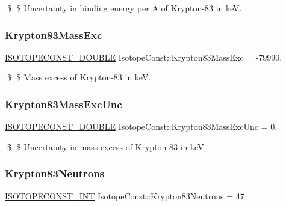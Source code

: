 \$ \$ Uncertainty in binding energy per A of Krypton-\/83 in keV. \mbox{\label{group___isotope_const-_krypton-_kr83_gadecc1351f9e0deb140149fa07912f4de}} 
\subsubsection{\texorpdfstring{Krypton83\+Mass\+Exc}{Krypton83MassExc}}
{\footnotesize\ttfamily \mbox{\hyperlink{group___isotope_const-_macros_ga8f45a7272ce02c0b4c65c44636ed719a}{I\+S\+O\+T\+O\+P\+E\+C\+O\+N\+S\+T\+\_\+\+D\+O\+U\+B\+LE}} Isotope\+Const\+::\+Krypton83\+Mass\+Exc = -\/79990.}

\$ \$ Mass excess of Krypton-\/83 in keV. \mbox{\label{group___isotope_const-_krypton-_kr83_ga3bacacfa5679f28ad0a2ba7652bfaedf}} 
\subsubsection{\texorpdfstring{Krypton83\+Mass\+Exc\+Unc}{Krypton83MassExcUnc}}
{\footnotesize\ttfamily \mbox{\hyperlink{group___isotope_const-_macros_ga8f45a7272ce02c0b4c65c44636ed719a}{I\+S\+O\+T\+O\+P\+E\+C\+O\+N\+S\+T\+\_\+\+D\+O\+U\+B\+LE}} Isotope\+Const\+::\+Krypton83\+Mass\+Exc\+Unc = 0.}

\$ \$ Uncertainty in mass excess of Krypton-\/83 in keV. \mbox{\label{group___isotope_const-_krypton-_kr83_gaa97e32cec33a17558e64f668ce43aafb}} 
\subsubsection{\texorpdfstring{Krypton83\+Neutrons}{Krypton83Neutrons}}
{\footnotesize\ttfamily \mbox{\hyperlink{group___isotope_const-_macros_ga5f18360b3e99483a35c32d789e62621c}{I\+S\+O\+T\+O\+P\+E\+C\+O\+N\+S\+T\+\_\+\+I\+NT}} Isotope\+Const\+::\+Krypton83\+Neutrons = 47}

